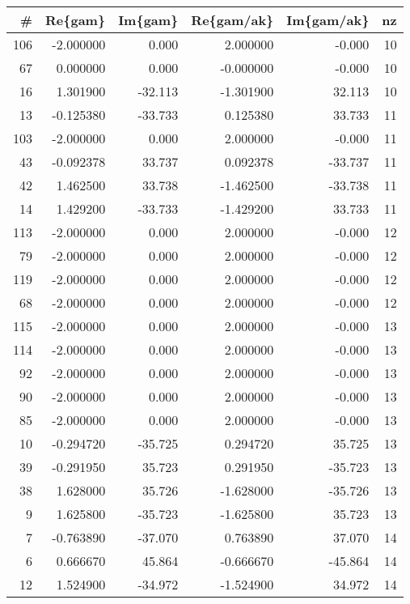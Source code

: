 \small \begin{tabular}{rrrrrr}
\toprule
  \# &   Re\{gam\} &  Im\{gam\} &  Re\{gam/ak\} &  Im\{gam/ak\} &  nz \\
\midrule
106 & -2.000000 &    0.000 &    2.000000 &      -0.000 &  10 \\
 67 &  0.000000 &    0.000 &   -0.000000 &      -0.000 &  10 \\
 16 &  1.301900 &  -32.113 &   -1.301900 &      32.113 &  10 \\
 13 & -0.125380 &  -33.733 &    0.125380 &      33.733 &  11 \\
103 & -2.000000 &    0.000 &    2.000000 &      -0.000 &  11 \\
 43 & -0.092378 &   33.737 &    0.092378 &     -33.737 &  11 \\
 42 &  1.462500 &   33.738 &   -1.462500 &     -33.738 &  11 \\
 14 &  1.429200 &  -33.733 &   -1.429200 &      33.733 &  11 \\
113 & -2.000000 &    0.000 &    2.000000 &      -0.000 &  12 \\
 79 & -2.000000 &    0.000 &    2.000000 &      -0.000 &  12 \\
119 & -2.000000 &    0.000 &    2.000000 &      -0.000 &  12 \\
 68 & -2.000000 &    0.000 &    2.000000 &      -0.000 &  12 \\
115 & -2.000000 &    0.000 &    2.000000 &      -0.000 &  13 \\
114 & -2.000000 &    0.000 &    2.000000 &      -0.000 &  13 \\
 92 & -2.000000 &    0.000 &    2.000000 &      -0.000 &  13 \\
 90 & -2.000000 &    0.000 &    2.000000 &      -0.000 &  13 \\
 85 & -2.000000 &    0.000 &    2.000000 &      -0.000 &  13 \\
 10 & -0.294720 &  -35.725 &    0.294720 &      35.725 &  13 \\
 39 & -0.291950 &   35.723 &    0.291950 &     -35.723 &  13 \\
 38 &  1.628000 &   35.726 &   -1.628000 &     -35.726 &  13 \\
  9 &  1.625800 &  -35.723 &   -1.625800 &      35.723 &  13 \\
  7 & -0.763890 &  -37.070 &    0.763890 &      37.070 &  14 \\
  6 &  0.666670 &   45.864 &   -0.666670 &     -45.864 &  14 \\
 12 &  1.524900 &  -34.972 &   -1.524900 &      34.972 &  14 \\

\end{tabular}
